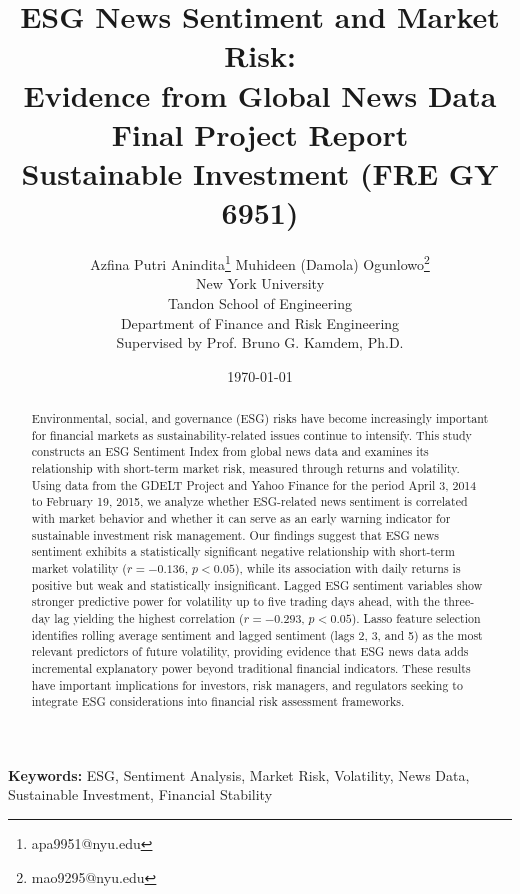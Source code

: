 \documentclass[12pt,a4paper]{article}
\title{
    \vspace{-2cm}
    \textbf{\LARGE ESG News Sentiment and Market Risk:} \\
    \vspace{0.3cm}
    \textbf{\LARGE Evidence from Global News Data} \\
    \vspace{1cm}
    \normalsize Final Project Report \\
    \normalsize Sustainable Investment (FRE GY 6951)
}
\author{
    Azfina Putri Anindita\thanks{apa9951@nyu.edu} \quad
    Muhideen (Damola) Ogunlowo\thanks{mao9295@nyu.edu}
    \\
    \normalsize New York University \\
    \normalsize Tandon School of Engineering \\
    \normalsize Department of Finance and Risk Engineering \\
    \vspace{0.5cm}
    \normalsize Supervised by Prof. Bruno G. Kamdem, Ph.D.
}
\date{\today}
\begin{document}
\maketitle
\thispagestyle{empty}

\vfill

\begin{abstract}
\noindent
Environmental, social, and governance (ESG) risks have become increasingly important for financial markets as sustainability-related issues continue to intensify. This study constructs an ESG Sentiment Index from global news data and examines its relationship with short-term market risk, measured through returns and volatility. Using data from the GDELT Project and Yahoo Finance for the period April 3, 2014 to February 19, 2015, we analyze whether ESG-related news sentiment is correlated with market behavior and whether it can serve as an early warning indicator for sustainable investment risk management. Our findings suggest that ESG news sentiment exhibits a statistically significant negative relationship with short-term market volatility ($r = -0.136$, $p < 0.05$), while its association with daily returns is positive but weak and statistically insignificant. Lagged ESG sentiment variables show stronger predictive power for volatility up to five trading days ahead, with the three-day lag yielding the highest correlation ($r = -0.293$, $p < 0.05$). Lasso feature selection identifies rolling average sentiment and lagged sentiment (lags 2, 3, and 5) as the most relevant predictors of future volatility, providing evidence that ESG news data adds incremental explanatory power beyond traditional financial indicators. These results have important implications for investors, risk managers, and regulators seeking to integrate ESG considerations into financial risk assessment frameworks.
\end{abstract}

\noindent
\textbf{Keywords:} ESG, Sentiment Analysis, Market Risk, Volatility, News Data, Sustainable Investment, Financial Stability

\vfill

\clearpage

\tableofcontents
\clearpage

\listoffigures
\clearpage

\listoftables
\clearpage

\end{document}
